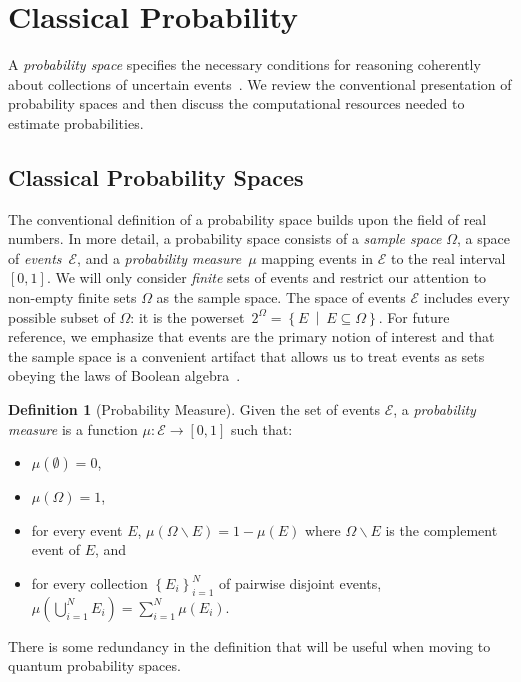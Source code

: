 \documentclass[12pt]{iopart}
\theoremstyle{plain}
\theoremstyle{definition}
\newtheorem{definition}[thm]{Definition}
\newcommand{\events}{\ensuremath{\mathcal{E}}}
\newcommand{\pmeas}{\ensuremath{\mu}}
\newcommand{\set}[2]{\ensuremath{\left\{ {#1}~\middle|~{#2}\right\} }}
\begin{document}
\section{Classical Probability}

A \emph{probability space} specifies the necessary conditions for
reasoning coherently about collections of uncertain
events~\cite{Kolmogorov1950,Shafer1976,Griffiths2003,Swart2013}.  We
review the conventional presentation of probability spaces and then
discuss the computational resources needed to estimate probabilities.

\subsection{Classical Probability Spaces}

The conventional definition of a probability space builds upon the
field of real numbers. In more detail, a probability space consists
of a \emph{sample space} $\Omega$, a space of \emph{events}~$\events$,
and a \emph{probability measure}~$\pmeas$ mapping events in $\events$
to the real interval $[0,1]$. We will only consider \emph{finite}
sets of events and restrict our attention to non-empty finite sets
$\Omega$ as the sample space. The space of events $\events$ includes
every possible subset of $\Omega$: it is the powerset~$2^{\Omega}=\set{E}{E\subseteq\Omega}$.
For future reference, we emphasize that events are the primary notion
of interest and that the sample space is a convenient artifact that
allows us to treat events as sets obeying the laws of Boolean algebra~\cite{Boole1948,Redhead1987-REDINA,Griffiths2003}.

\begin{definition}[Probability Measure]\label{def:ClassicalProbabilitySpace}
  Given the set of events $\events$, a \emph{probability measure} is a
  function $\pmeas:\events\rightarrow[0,1]$ such that:
\begin{itemize}
\item $\pmeas(\emptyset)=0$,
\item $\pmeas(\Omega)=1$, 
\item for every event $E$,
  $\pmeas\left(\Omega\backslash E\right)=1-\pmeas\left(E\right)$ where
  $\Omega\backslash E$ is the complement event of $E$, and
\item for every collection $\left\{ E_{i}\right\} _{i=1}^{N}$ of
  pairwise disjoint events,
  $\pmeas\left(\bigcup_{i=1}^{N}E_{i}\right)=\sum_{i=1}^{N}\pmeas(E_{i})$.
\end{itemize}
\end{definition}
\noindent There is some redundancy in the definition that will be useful when
moving to quantum probability spaces. 
\end{document}
